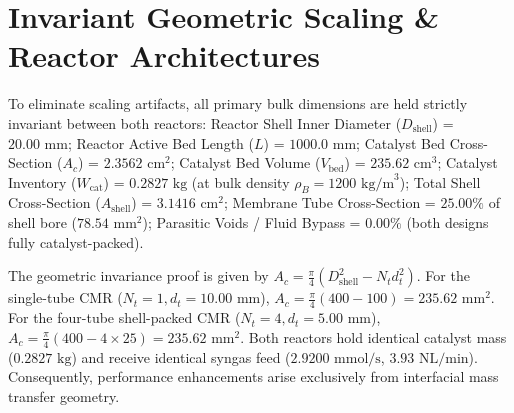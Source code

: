 \documentclass[12pt,a4paper]{article}
\begin{document}
\section{Invariant Geometric Scaling \& Reactor Architectures}
To eliminate scaling artifacts, all primary bulk dimensions are held strictly invariant between both reactors: Reactor Shell Inner Diameter ($D_{\text{shell}}$) = $20.00\text{ mm}$; Reactor Active Bed Length ($L$) = $1000.0\text{ mm}$; Catalyst Bed Cross-Section ($A_c$) = $2.3562\text{ cm}^2$; Catalyst Bed Volume ($V_{\text{bed}}$) = $235.62\text{ cm}^3$; Catalyst Inventory ($W_{\text{cat}}$) = $0.2827\text{ kg}$ (at bulk density $\rho_B = 1200\text{ kg/m}^3$); Total Shell Cross-Section ($A_{\text{shell}}$) = $3.1416\text{ cm}^2$; Membrane Tube Cross-Section = $25.00\%$ of shell bore ($78.54\text{ mm}^2$); Parasitic Voids / Fluid Bypass = $0.00\%$ (both designs fully catalyst-packed).

The geometric invariance proof is given by $A_c = \frac{\pi}{4} (D_{\text{shell}}^2 - N_t d_t^2)$. For the single-tube CMR ($N_t = 1, d_t = 10.00\text{ mm}$), $A_c = \frac{\pi}{4} (400 - 100) = 235.62\text{ mm}^2$. For the four-tube shell-packed CMR ($N_t = 4, d_t = 5.00\text{ mm}$), $A_c = \frac{\pi}{4} (400 - 4 \times 25) = 235.62\text{ mm}^2$. Both reactors hold identical catalyst mass ($0.2827\text{ kg}$) and receive identical syngas feed ($2.9200\text{ mmol/s}$, $3.93\text{ NL/min}$). Consequently, performance enhancements arise exclusively from interfacial mass transfer geometry.
\end{document}

